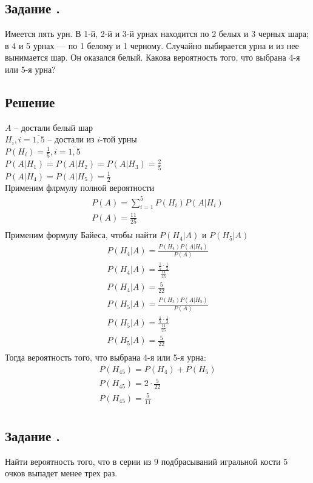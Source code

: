 \documentclass[12pt]{article}
\begin{document}
\newpage

\subsection{Задание .}
Имеется пять урн. В 1-й, 2-й и 3-й урнах находится по 2 белых и 3 черных шара;
в 4 и 5 урнах — по 1 белому и 1 черному.
Случайно выбирается урна и из нее вынимается шар. Он оказался белый.
Какова вероятность того, что выбрана 4-я или 5-я урна?
\subsection*{Решение}
$A$ -- достали белый шар \\
$H_i, i = \overline{1, 5}$ -- достали из $i$-той урны \\
$P(H_i) = \frac{1}{5}, i = \overline{1, 5}$ \\
$P(A|H_1) = P(A|H_2) = P(A|H_3) = \frac{2}{5}$ \\
$P(A|H_4) = P(A|H_5) = \frac{1}{2}$ \\
Применим флрмулу полной вероятности
\begin{gather*}
	P(A) = \sum_{i = 1}^5 P(H_i)P(A|H_i) \\
	P(A) = \frac{11}{25} \\
\end{gather*}
Применим формулу Байеса, чтобы найти $P(H_4|A)$ и $P(H_5|A)$
\begin{gather*}
	P(H_4|A) = \frac{P(H_4)P(A|H_4)}{P(A)} \\
	P(H_4|A) = \frac{\frac{1}{5} \cdot \frac{1}{2}}{\frac{11}{25}} \\
	P(H_4|A) = \frac{5}{22} \\
	P(H_5|A) = \frac{P(H_5)P(A|H_5)}{P(A)} \\
	P(H_5|A) = \frac{\frac{1}{5} \cdot \frac{1}{2}}{\frac{11}{25}} \\
	P(H_5|A) = \frac{5}{22} \\
\end{gather*}
Тогда вероятность того, что выбрана 4-я или 5-я урна:
\begin{gather*}
	P(H_{45}) = P(H_4) + P(H_5) \\
	P(H_{45}) = 2 \cdot \frac{5}{22} \\
	P(H_{45}) = \frac{5}{11} \\
\end{gather*}

\newpage

\subsection{Задание .}
Найти вероятность того, что в серии из 9 подбрасываний игральной кости 5 очков выпадет менее трех раз.
\end{document}
